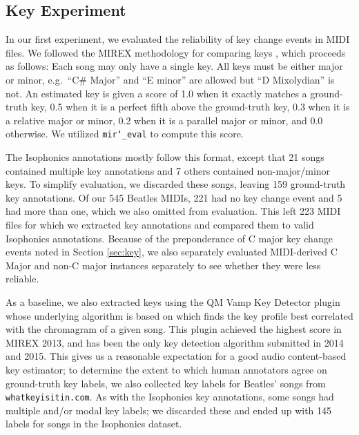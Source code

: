 \documentclass{article}
\begin{document}
\subsection{Key Experiment}

In our first experiment, we evaluated the reliability of key change events in MIDI files.
We followed the MIREX methodology for comparing keys \cite{ehmann2016mirex}, which proceeds as follows:
Each song may only have a single key.
All keys must be either major or minor, e.g.\ ``C\# Major'' and ``E minor'' are allowed but ``D Mixolydian'' is not.
An estimated key is given a score of 1.0 when it exactly matches a ground-truth key, 0.5 when it is a perfect fifth above the ground-truth key, 0.3 when it is a relative major or minor, 0.2 when it is a parallel major or minor, and 0.0 otherwise.
We utilized \texttt{mir\char`_eval} \cite{raffel2014mir_eval} to compute this score.

The Isophonics annotations mostly follow this format, except that 21 songs contained multiple key annotations and 7 others contained non-major/minor keys.
To simplify evaluation, we discarded these songs, leaving 159 ground-truth key annotations.
Of our 545 Beatles MIDIs, 221 had no key change event and 5 had more than one, which we also omitted from evaluation.
This left 223 MIDI files for which we extracted key annotations and compared them to valid Isophonics annotations.
Because of the preponderance of C major key change events noted in Section \ref{sec:key}, we also separately evaluated MIDI-derived C Major and non-C major instances separately to see whether they were less reliable.

As a baseline, we also extracted keys using the QM Vamp Key Detector plugin \cite{cannam2015mirex} whose underlying algorithm is based on \cite{noland2007signal} which finds the key profile best correlated with the chromagram of a given song.
This plugin achieved the highest score in MIREX 2013, and has been the only key detection algorithm submitted in 2014 and 2015.
This gives us a reasonable expectation for a good audio content-based key estimator; to determine the extent to which human annotators agree on ground-truth key labels, we also collected key labels for Beatles' songs from \texttt{whatkeyisitin.com}.
As with the Isophonics key annotations, some songs had multiple and/or modal key labels; we discarded these and ended up with 145 labels for songs in the Isophonics dataset.
\end{document}
